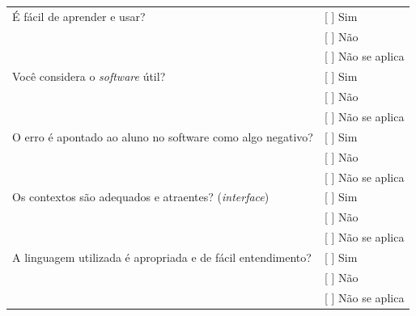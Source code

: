\documentclass[
	12pt,				%
    oneside,			%
	a4paper,			%
	english,			%
	french,				%
	spanish,			%
	brazil,				%
	]{abntex2}
\begin{document}
\begin{apendicesenv}
\begin{center}
\begin{longtable}{l|l}
    \\
    \hline
    É fácil de aprender e usar? & [  ] Sim \\ & [ ] Não \\ & [  ] Não se aplica
    \\
    \hline
    Você considera o \textit{software} útil? & [  ] Sim \\ & [ ] Não \\ & [  ] Não se aplica
    \\
    \hline
    O erro é apontado ao aluno no software como algo negativo? & [  ] Sim \\ & [ ] Não \\ & [  ] Não se aplica
    \\
    \hline
    Os contextos são adequados e atraentes? (\textit{interface}) & [  ] Sim \\ & [ ] Não \\ & [  ] Não se aplica
    \\
    \hline
    A linguagem utilizada é apropriada e de fácil entendimento? & [  ] Sim \\ & [ ] Não \\ & [  ] Não se aplica
    \\
    \hline
\end{longtable}
\end{center}

\end{apendicesenv}
\end{document}
